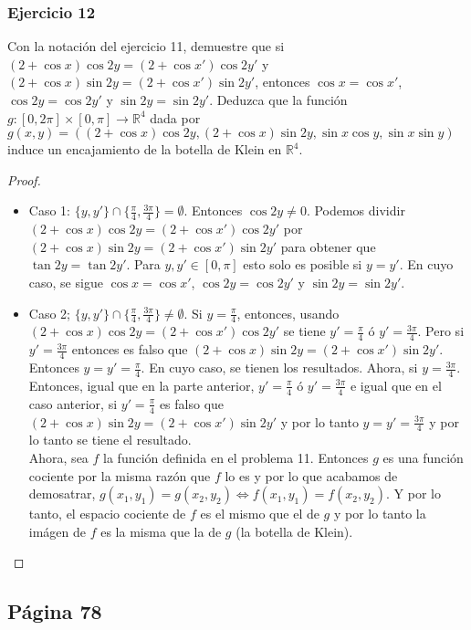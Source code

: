 \documentclass[letterpaper]{article}
\begin{document}
\subsubsection*{Ejercicio  12}
Con la notaci\'on del ejercicio 11, demuestre que si $(2+\cos x)\cos 2y=(2+\cos x')\cos 2y'$ y $(2 + \cos x) \sin 2y=(2+\cos x') \sin 2y'$, entonces $\cos x=\cos x'$, $\cos 2y=\cos 2y'$ y $\sin 2y=\sin 2y'$. Deduzca que la funci\'on  $g:[0,2\pi ] \times [0, \pi ] \rightarrow \mathbb{R}^{4}$ dada por $ g(x, y) = ((2 + \cos x) \cos 2y, (2 + \cos x) \sin 2y,\sin x\cos y,\sin x \sin y)$ induce un encajamiento de  la botella de Klein en $\mathbb{R}^4$.
\begin{proof}
\begin{itemize}
\item Caso 1: $\{y,y'\}\cap \{\frac{\pi}{4}, \frac{3\pi}{4}\}=\emptyset$. Entonces $\cos 2y\neq 0 $. Podemos dividir $(2+\cos x)\cos 2y=(2+\cos x')\cos 2y'$ por $(2 + \cos x) \sin 2y=(2+\cos x') \sin 2y'$  para obtener que $\tan 2y=\tan 2y'$. Para $y, y' \in [0,\pi ]$  esto solo es  posible si $y=y'$. En  cuyo caso, se   sigue $\cos x=\cos x'$, $\cos 2y=\cos 2y'$ y $\sin 2y=\sin 2y'$.
\item Caso 2; $\{y,y'\}\cap \{\frac{\pi}{4}, \frac{3\pi}{4}\}\neq \emptyset$. Si  $y=\frac{\pi}{4}$, entonces,  usando $(2+\cos x)\cos 2y=(2+\cos x')\cos 2y'$ se tiene $y'=\frac{\pi}{4}$ \'o $y'=\frac{3\pi}{4}$. Pero  si $y'=\frac{3\pi}{4}$ entonces es  falso que  $(2 + \cos x) \sin 2y=(2+\cos x') \sin 2y'$. Entonces $y=y'=\frac{\pi}{4}$. En cuyo caso, se  tienen los resultados.  Ahora,  si $y=\frac{3\pi}{4}$. Entonces, igual que en la parte anterior, $y'=\frac{\pi}{4}$ \'o $y'=\frac{3\pi}{4}$ e  igual que  en el caso anterior, si $y'=\frac{\pi}{4}$ es  falso que  $(2 + \cos x) \sin 2y=(2+\cos x') \sin 2y'$   y por lo tanto $y=y'=\frac{3\pi}{4}$ y por lo tanto se tiene  el resultado.\\
Ahora, sea $f$ la funci\'on definida  en  el problema 11. Entonces  $g$ es  una funci\'on cociente por la misma raz\'on que $f$ lo es  y por lo  que acabamos de  demosatrar, $g(x_1, y_1) = g(x_2, y_2) \Leftrightarrow  f(x_1, y_1) = f(x_2, y_2)$. Y por lo tanto, el espacio cociente de $f$ es el mismo que el de $g$  y por lo tanto la im\'agen de $f$ es  la  misma que la de $g$ (la botella de  Klein).
\end{itemize}
\end{proof}
\subsection{P\'agina 78}
\end{document}
